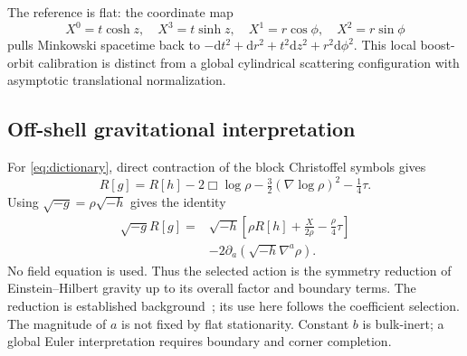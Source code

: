 \documentclass[11pt]{article}
\newcommand{\dd}{\mathrm d}
\begin{document}
The reference is flat: the coordinate map
\[
X^0=t\cosh z,\quad X^3=t\sinh z,\quad
X^1=r\cos\phi,\quad X^2=r\sin\phi
\]
pulls Minkowski spacetime back to $-\dd t^2+\dd r^2+t^2\dd z^2+r^2\dd\phi^2$. This local boost-orbit calibration is distinct from a global cylindrical scattering configuration with asymptotic translational normalization.

\subsection{Off-shell gravitational interpretation}
For \eqref{eq:dictionary}, direct contraction of the block Christoffel symbols gives
\begin{equation}
R[g]=R[h]-2\Box\log\rho-\tfrac32(\nabla\log\rho)^2-\tfrac14\tau.
\end{equation}
Using $\sqrt{-g}=\rho\sqrt{-h}$ gives the identity
\begin{equation}\label{eq:EH}
\begin{split}
\sqrt{-g}R[g]={}&\sqrt{-h}\left[\rho R[h]+\frac{X}{2\rho}-\frac\rho4\tau\right]\\
&-2\partial_a\left(\sqrt{-h}\nabla^a\rho\right).
\end{split}
\end{equation}
No field equation is used. Thus the selected action is the symmetry reduction of Einstein--Hilbert gravity up to its overall factor and boundary terms. The reduction is established background~\cite{Cruz,Grumiller}; its use here follows the coefficient selection. The magnitude of $a$ is not fixed by flat stationarity. Constant $b$ is bulk-inert; a global Euler interpretation requires boundary and corner completion.
\end{document}
